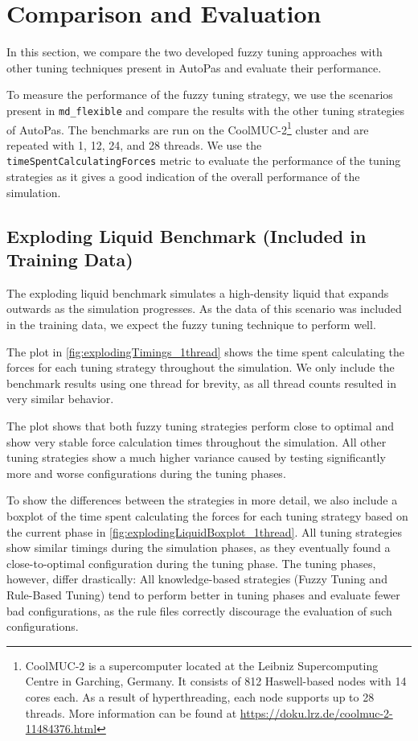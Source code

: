 \chapter{Comparison and Evaluation}
\label{sec:comparison_and_evaluation}

In this section, we compare the two developed fuzzy tuning approaches with other tuning techniques present in AutoPas and evaluate their performance.

\medskip

\noindent To measure the performance of the fuzzy tuning strategy, we use the scenarios present in \texttt{md\_flexible} and compare the results with the other tuning strategies of AutoPas. The benchmarks are run on the CoolMUC-2\footnote{\label{CoolMucSpecs}CoolMUC-2 is a supercomputer located at the Leibniz Supercomputing Centre in Garching, Germany. It consists of 812 Haswell-based nodes with 14 cores each. As a result of hyperthreading, each node supports up to 28 threads. More information can be found at \url{https://doku.lrz.de/coolmuc-2-11484376.html}} cluster and are repeated with 1, 12, 24, and 28 threads. We use the \texttt{timeSpentCalculatingForces} metric to evaluate the performance of the tuning strategies as it gives a good indication of the overall performance of the simulation.


\section{Exploding Liquid Benchmark (Included in Training Data)}
\label{sec:explodingLiquidBenchmark}

The exploding liquid benchmark simulates a high-density liquid that expands outwards as the simulation progresses. As the data of this scenario was included in the training data, we expect the fuzzy tuning technique to perform well.

The plot in \autoref{fig:explodingTimings_1thread} shows the time spent calculating the forces for each tuning strategy throughout the simulation. We only include the benchmark results using one thread for brevity, as all thread counts resulted in very similar behavior.

The plot shows that both fuzzy tuning strategies perform close to optimal and show very stable force calculation times throughout the simulation. All other tuning strategies show a much higher variance caused by testing significantly more and worse configurations during the tuning phases.

To show the differences between the strategies in more detail, we also include a boxplot of the time spent calculating the forces for each tuning strategy based on the current phase in \autoref{fig:explodingLiquidBoxplot_1thread}. All tuning strategies show similar timings during the simulation phases, as they eventually found a close-to-optimal configuration during the tuning phase. The tuning phases, however, differ drastically: All knowledge-based strategies (Fuzzy Tuning and Rule-Based Tuning) tend to perform better in tuning phases and evaluate fewer bad configurations, as the rule files correctly discourage the evaluation of such configurations.

